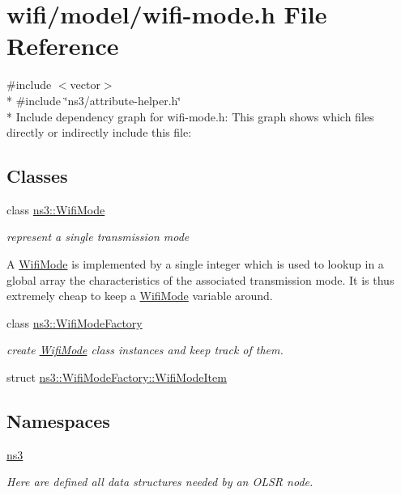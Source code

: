 \hypertarget{wifi-mode_8h}{}\section{wifi/model/wifi-\/mode.h File Reference}
\label{wifi-mode_8h}
{\ttfamily \#include $<$vector$>$}\\*
{\ttfamily \#include \char`\"{}ns3/attribute-\/helper.\+h\char`\"{}}\\*
Include dependency graph for wifi-\/mode.h\+:
This graph shows which files directly or indirectly include this file\+:
\subsection*{Classes}
\begin{DoxyCompactItemize}
\item 
class \hyperlink{classns3_1_1WifiMode}{ns3\+::\+Wifi\+Mode}
\begin{DoxyCompactList}\small\item\em represent a single transmission mode

A \hyperlink{classns3_1_1WifiMode}{Wifi\+Mode} is implemented by a single integer which is used to lookup in a global array the characteristics of the associated transmission mode. It is thus extremely cheap to keep a \hyperlink{classns3_1_1WifiMode}{Wifi\+Mode} variable around. \end{DoxyCompactList}\item 
class \hyperlink{classns3_1_1WifiModeFactory}{ns3\+::\+Wifi\+Mode\+Factory}
\begin{DoxyCompactList}\small\item\em create \hyperlink{classns3_1_1WifiMode}{Wifi\+Mode} class instances and keep track of them. \end{DoxyCompactList}\item 
struct \hyperlink{structns3_1_1WifiModeFactory_1_1WifiModeItem}{ns3\+::\+Wifi\+Mode\+Factory\+::\+Wifi\+Mode\+Item}
\end{DoxyCompactItemize}
\subsection*{Namespaces}
\begin{DoxyCompactItemize}
\item 
 \hyperlink{namespacens3}{ns3}
\begin{DoxyCompactList}\small\item\em Here are defined all data structures needed by an O\+L\+SR node. \end{DoxyCompactList}\end{DoxyCompactItemize}
